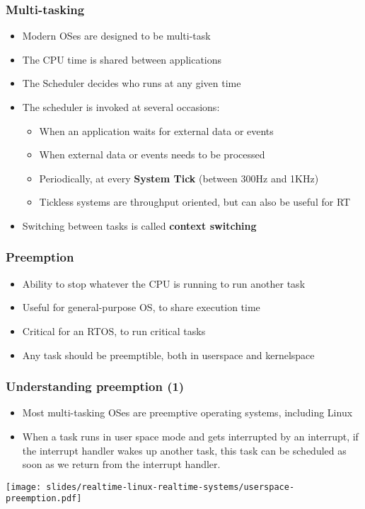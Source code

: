 \begin{frame}
  \frametitle{Multi-tasking}
	\begin{itemize}
		\item Modern OSes are designed to be multi-task
		\item The CPU time is shared between applications
		\item The Scheduler decides who runs at any given time
		\item The scheduler is invoked at several occasions:
			\begin{itemize}
				\item When an application waits for external data or events
				\item When external data or events needs to be processed
				\item Periodically, at every \textbf{System Tick} (between 300Hz and 1KHz)
				\item Tickless systems are throughput oriented, but can also be useful for RT
			\end{itemize}
		\item Switching between tasks is called \textbf{context switching}
	\end{itemize}
\end{frame}

\begin{frame}
	\frametitle{Preemption}
	\begin{itemize}
		\item Ability to stop whatever the CPU is running to run another task
		\item Useful for general-purpose OS, to share execution time
		\item Critical for an RTOS, to run critical tasks
		\item Any task should be preemptible, both in userspace and kernelspace
	\end{itemize}
\end{frame}

\begin{frame}
  \frametitle{Understanding preemption (1)}
  \begin{itemize}
  \item Most multi-tasking OSes are preemptive operating systems, including Linux
  \item When a task runs in user space mode and gets interrupted by an
    interrupt, if the interrupt handler wakes up another task, this
    task can be scheduled as soon as we return from the interrupt
    handler.
  \end{itemize}
  \begin{center}
    \texttt{[image: slides/realtime-linux-realtime-systems/userspace-preemption.pdf]}
  \end{center}
\end{frame}

